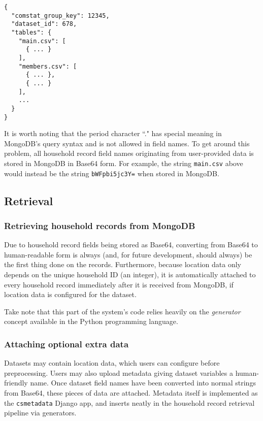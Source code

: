 \begin{lstlisting}
{
  "comstat_group_key": 12345,
  "dataset_id": 678,
  "tables": {
    "main.csv": [
      { ... }
    ],
    "members.csv": [
      { ... },
      { ... }
    ],
    ...
  }
}
\end{lstlisting}

It is worth noting that the period character ``." has special meaning in MongoDB's query syntax and is not allowed in field names. To get around this problem, all household record field names originating from user-provided data is stored in MongoDB in Base64 form. For example, the string \texttt{main.csv} above would instead be the string \texttt{bWFpbi5jc3Y=} when stored in MongoDB.


\subsection{Retrieval}

\subsubsection{Retrieving household records from MongoDB}

Due to household record fields being stored as Base64, converting from Base64 to human-readable form is always (and, for future development, should always) be the first thing done on the records. Furthermore, because location data only depends on the unique household ID (an integer), it is automatically attached to every household record immediately after it is received from MongoDB, if location data is configured for the dataset.

Take note that this part of the system's code relies heavily on the \emph{generator} concept available in the Python programming language.

\subsubsection{Attaching optional extra data}

Datasets may contain location data, which users can configure before preprocessing. Users may also upload metadata giving dataset variables a human-friendly name. Once dataset field names have been converted into normal strings from Base64, these pieces of data are attached. Metadata itself is implemented as the \texttt{csmetadata} Django app, and inserts neatly in the household record retrieval pipeline via generators.


